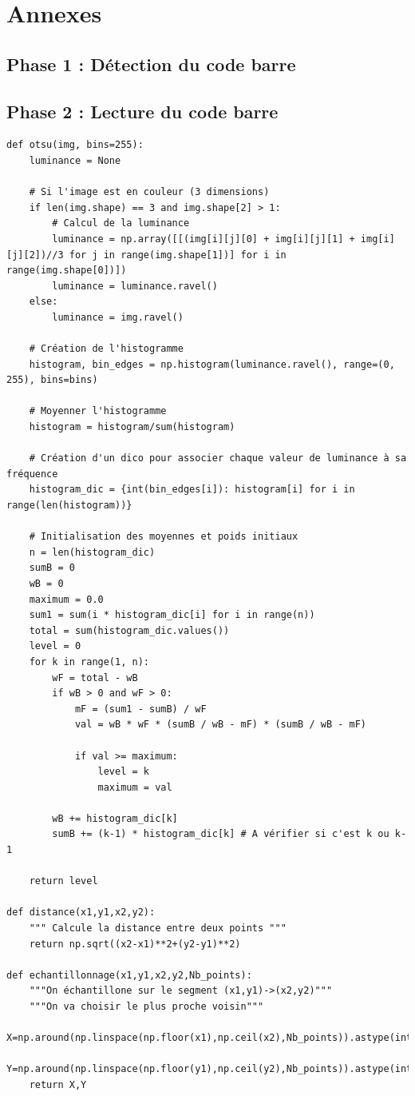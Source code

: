 \documentclass{rapport}
\begin{document}
\newpage

\section{Annexes}

\lstset{style=mystyle}

\subsection{Phase 1 : Détection du code barre}

\subsection{Phase 2 : Lecture du code barre}
\begin{lstlisting}
def otsu(img, bins=255):
	luminance = None
	
	# Si l'image est en couleur (3 dimensions)
	if len(img.shape) == 3 and img.shape[2] > 1:
		# Calcul de la luminance 
		luminance = np.array([[(img[i][j][0] + img[i][j][1] + img[i][j][2])//3 for j in range(img.shape[1])] for i in range(img.shape[0])])
		luminance = luminance.ravel()
	else:
		luminance = img.ravel()
	
	# Création de l'histogramme
	histogram, bin_edges = np.histogram(luminance.ravel(), range=(0, 255), bins=bins)
	
	# Moyenner l'histogramme
	histogram = histogram/sum(histogram)    
	
	# Création d'un dico pour associer chaque valeur de luminance à sa fréquence
	histogram_dic = {int(bin_edges[i]): histogram[i] for i in range(len(histogram))}
	
	# Initialisation des moyennes et poids initiaux
	n = len(histogram_dic)
	sumB = 0
	wB = 0
	maximum = 0.0
	sum1 = sum(i * histogram_dic[i] for i in range(n))
	total = sum(histogram_dic.values())
	level = 0
	for k in range(1, n):
		wF = total - wB
		if wB > 0 and wF > 0:
			mF = (sum1 - sumB) / wF
			val = wB * wF * (sumB / wB - mF) * (sumB / wB - mF)
			
			if val >= maximum:
				level = k
				maximum = val
		
		wB += histogram_dic[k]
		sumB += (k-1) * histogram_dic[k] # A vérifier si c'est k ou k-1
	
	return level

def distance(x1,y1,x2,y2):
	""" Calcule la distance entre deux points """
	return np.sqrt((x2-x1)**2+(y2-y1)**2)

def echantillonnage(x1,y1,x2,y2,Nb_points):
	"""On échantillone sur le segment (x1,y1)->(x2,y2)"""
	"""On va choisir le plus proche voisin"""
	X=np.around(np.linspace(np.floor(x1),np.ceil(x2),Nb_points)).astype(int)
	Y=np.around(np.linspace(np.floor(y1),np.ceil(y2),Nb_points)).astype(int)
	return X,Y



\end{lstlisting}
\end{document}
